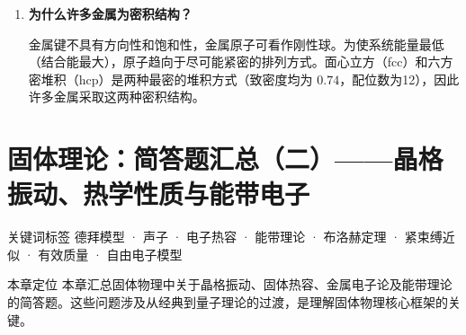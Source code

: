 \begin{enumerate}[label=\textbf{\arabic*.}, leftmargin=2em, itemsep=0.8em]
\textbf{举例}：体心立方结构的碱金属和面心立方结构的 Au、Ag、Cu 是简单格子；NaCl、CsCl、金刚石、ZnS 是复式格子。

\item \textbf{为什么许多金属为密积结构？}

金属键不具有方向性和饱和性，金属原子可看作刚性球。为使系统能量最低（结合能最大），原子趋向于尽可能紧密的排列方式。面心立方（fcc）和六方密堆积（hcp）是两种最密的堆积方式（致密度均为 $0.74$，配位数为12），因此许多金属采取这两种密积结构。

\end{enumerate}

\section{固体理论：简答题汇总（二）——晶格振动、热学性质与能带电子}
\label{sec:solid-state-short-2}

\begin{tipbox}{关键词标签}
德拜模型 · 声子 · 电子热容 · 能带理论 · 布洛赫定理 · 紧束缚近似 · 有效质量 · 自由电子模型
\end{tipbox}

\begin{insightbox}{本章定位}
本章汇总固体物理中关于晶格振动、固体热容、金属电子论及能带理论的简答题。这些问题涉及从经典到量子理论的过渡，是理解固体物理核心框架的关键。
\end{insightbox}

\vspace{0.5em}

